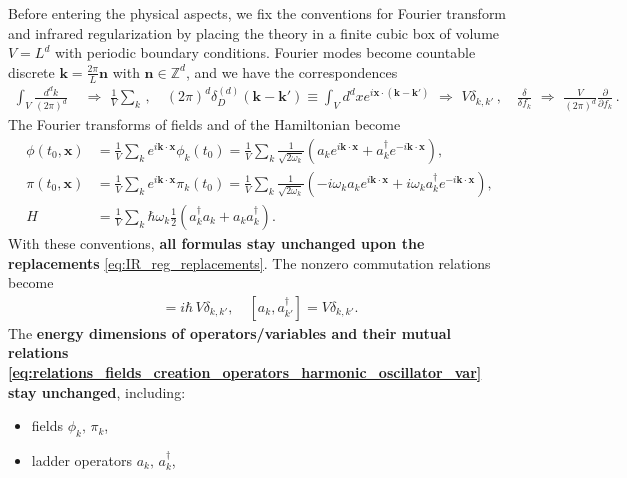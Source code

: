 \documentclass[../QFT_main.tex]{subfiles}
\begin{document}
\begin{mytheorem}
%
Before entering the physical aspects, we fix the conventions for Fourier transform and infrared regularization by placing the theory in a finite cubic box of volume $V=L^d$ with periodic boundary conditions.
Fourier modes become countable discrete $\mathbf{k} = \frac{2\pi}{L} \mathbf{n}$ with $\mathbf{n}\in\mathbb{Z}^d$, and we have the correspondences
{\small\begin{align}\label{eq:IR_reg_replacements}
    \int_V \frac{d^d k}{(2\pi)^d} &\,\,\Rightarrow \,\,\frac{1}{V} \sum_k\,, \quad
    (2\pi)^d \delta^{(d)}_D(\mathbf{k} - \mathbf{k}') \equiv \int_V d^dx e^{i\mathbf{x}\cdot(\mathbf{k} - \mathbf{k}')} \,\,\Rightarrow \,\,V \delta_{k,k'}\,,\quad \frac{\delta}{\delta f_k}\,\,\Rightarrow \,\, \frac{V}{(2\pi)^d} \frac{\partial}{\partial f_k}\,.
\end{align}}
The Fourier transforms of fields and of the Hamiltonian become
\begin{align}
    \phi(t_0,\mathbf{x})&= \frac{1}{V} \sum_k e^{i \mathbf{k}\cdot\mathbf{x}} \phi_k(t_0) = \frac{1}{V} \sum_k \frac{1}{\sqrt{2\omega_k}} \left( a_k e^{i \mathbf{k}\cdot\mathbf{x}} + a_k^{\dagger} e^{- i \mathbf{k}\cdot\mathbf{x}} \right),
    \\
    \pi(t_0,\mathbf{x})&= \frac{1}{V} \sum_k e^{i \mathbf{k}\cdot\mathbf{x}} \pi_k(t_0) = \frac{1}{V} \sum_k \frac{1}{\sqrt{2\omega_k}} \left( -i \omega_k a_k e^{i \mathbf{k}\cdot\mathbf{x}} + i \omega_k a_k^{\dagger} e^{- i \mathbf{k}\cdot\mathbf{x}} \right),
    \\
    H&= \frac{1}{V} \sum_k \hbar \omega_k \tfrac12\left( a_k^{\dagger} a_k + a_k a_k^\dagger \right).
\end{align}
%
With these conventions, \textbf{all formulas stay unchanged upon the replacements} \eqref{eq:IR_reg_replacements}.
The nonzero commutation relations become
\begin{align}
    [\phi_k(t), \pi_{k'}(t)] = i\hbar\, V \delta_{k,k'}, \quad
    [a_{k}, a_{k'}^{\dagger}] = V \delta_{k,k'}.
\end{align}
The \textbf{energy dimensions of operators/variables and their mutual relations \eqref{eq:relations_fields_creation_operators_harmonic_oscillator_var}  stay unchanged}, including:
\begin{itemize}
    \item fields $\phi_k,\,  \pi_k$,
    \item ladder operators $a_k,\, a_k^\dagger$,

\end{itemize}
\end{mytheorem}
\end{document}
